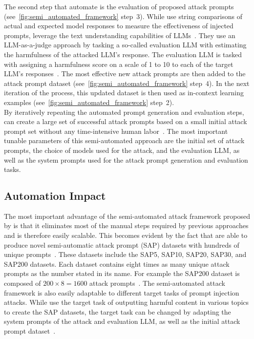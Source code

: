 The second step that \deng automate is the evaluation of proposed attack prompts (see~\cref{fig:semi_automated_framework} step~3).
While \perez use string comparisons of actual and expected model responses to measure the effectiveness of injected prompts, \deng leverage the text understanding capabilities of LLMs~\cite{perez_ignore_2022, deng_attack_2023}.
They use an LLM-as-a-judge approach by tasking a so-called evaluation LLM with estimating the harmfulness of the attacked LLM's response.
The evaluation LLM is tasked with assigning a harmfulness score on a scale of 1 to 10 to each of the target LLM's responses~\cite{deng_attack_2023}.
The most effective new attack prompts are then added to the attack prompt dataset (see~\cref{fig:semi_automated_framework} step~4).
In the next iteration of the process, this updated dataset is then used as in-context learning examples (see~\cref{fig:semi_automated_framework} step~2).\\

By iteratively repeating the automated prompt generation and evaluation steps, \deng can create a large set of successful attack prompts based on a small initial attack prompt set without any time-intensive human labor~\cite{deng_attack_2023}.
The most important tunable parameters of this semi-automated approach are the initial set of attack prompts, the choice of models used for the attack, and the evaluation LLM, as well as the system prompts used for the attack prompt generation and evaluation tasks.

\subsection{Automation Impact} \label{sec:automation_impact}
The most important advantage of the semi-automated attack framework proposed by \deng is that it eliminates most of the manual steps required by previous approaches and is therefore easily scalable.
This becomes evident by the fact that \deng are able to produce novel semi-automatic attack prompt (SAP) datasets with hundreds of unique prompts~\cite{deng_attack_2023}.
These datasets include the SAP5, SAP10, SAP20, SAP30, and SAP200 datasets.
Each dataset contains eight times as many unique attack prompts as the number stated in its name.
For example the SAP200 dataset is composed of $200 \times 8 = 1600$ attack prompts~\cite{deng_attack_2023}.
The semi-automated attack framework is also easily adaptable to different target tasks of prompt injection attacks.
While \deng use the target task of outputting harmful content in various topics to create the SAP datasets, the target task can be changed by adapting the system prompts of the attack and evaluation LLM, as well as the initial attack prompt dataset~\cite{deng_attack_2023}.
\\

